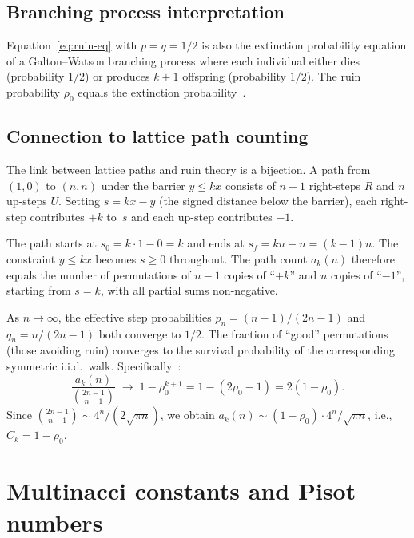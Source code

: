 \documentclass[11pt]{article}
\theoremstyle{definition}
\theoremstyle{remark}
\begin{document}
\subsection{Branching process interpretation}

Equation~\eqref{eq:ruin-eq} with $p = q = 1/2$ is also the extinction
probability equation of a Galton--Watson branching process where each
individual either dies (probability $1/2$) or produces $k + 1$ offspring
(probability $1/2$).
The ruin probability $\rho_0$ equals the extinction
probability~\cite{Feller1968}.

\subsection{Connection to lattice path counting}\label{subsec:ruin-lattice}

The link between lattice paths and ruin theory is a bijection.
A path from $(1, 0)$ to $(n, n)$ under the barrier $y \leq kx$ consists
of $n - 1$ right-steps $R$ and $n$ up-steps $U$.
Setting $s = kx - y$ (the signed distance below the barrier), each
right-step contributes $+k$ to~$s$ and each up-step contributes $-1$.

The path starts at $s_0 = k \cdot 1 - 0 = k$ and ends at
$s_f = kn - n = (k-1)n$.
The constraint $y \leq kx$ becomes $s \geq 0$ throughout.
The path count $a_k(n)$ therefore equals the number of
permutations of $n - 1$ copies of ``$+k$'' and $n$ copies of ``$-1$'',
starting from $s = k$, with all partial sums non-negative.

As $n \to \infty$, the effective step probabilities $p_n = (n-1)/(2n-1)$
and $q_n = n/(2n-1)$ both converge to $1/2$.
The fraction of ``good'' permutations (those avoiding ruin) converges
to the survival probability of the corresponding symmetric i.i.d.\ walk.
Specifically~\cite{BanderierFlajolet2002, Takacs1967}:
\begin{equation}\label{eq:survival}
\frac{a_k(n)}{\binom{2n-1}{n-1}} \;\longrightarrow\;
1 - \rho_0^{k+1} = 1 - (2\rho_0 - 1) = 2(1 - \rho_0).
\end{equation}
Since $\binom{2n-1}{n-1} \sim 4^n / (2\sqrt{\pi n})$, we obtain
$a_k(n) \sim (1 - \rho_0) \cdot 4^n / \sqrt{\pi n}$,
i.e., $C_k = 1 - \rho_0$.

\section{Multinacci constants and Pisot numbers}\label{sec:multinacci}
\end{document}
